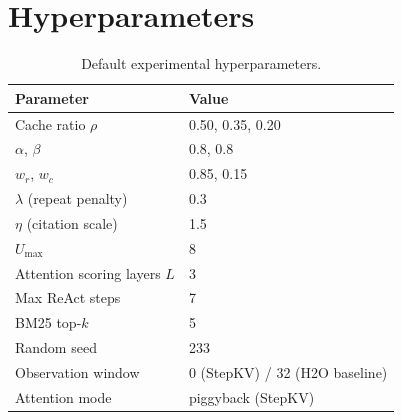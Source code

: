 \documentclass[11pt]{article}
\begin{document}
\section{Hyperparameters}
\label{app:hyperparams}

\begin{table}[h]
\centering
\small
\begin{tabular}{ll}
\toprule
Parameter & Value \\
\midrule
Cache ratio $\rho$ & 0.50, 0.35, 0.20 \\
$\alpha$, $\beta$ & 0.8, 0.8 \\
$w_r$, $w_c$ & 0.85, 0.15 \\
$\lambda$ (repeat penalty) & 0.3 \\
$\eta$ (citation scale) & 1.5 \\
$U_{\max}$ & 8 \\
Attention scoring layers $L$ & 3 \\
Max ReAct steps & 7 \\
BM25 top-$k$ & 5 \\
Random seed & 233 \\
Observation window & 0 (StepKV) / 32 (H2O baseline) \\
Attention mode & piggyback (StepKV) \\
\bottomrule
\end{tabular}
\caption{Default experimental hyperparameters.}
\label{tab:hyperparams}
\end{table}

\clearpage

\end{document}
